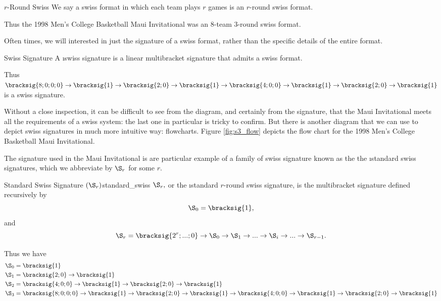 {    \begin{definition}{$r$-Round Swiss}{}
        We say a swiss format in which each team plays $r$ games is an $r$-round swiss format.
    \end{definition}

    Thus the 1998 Men's College Basketball Maui Invitational was an 8-team 3-round swiss format.

    Often times, we will interested in just the signature of a swiss format, rather than the specific details of the entire format.

    \begin{definition}{Swiss Signature}{}
        A \i{swiss signature} is a linear multibracket signature that admits a swiss format.
    \end{definition}

    Thus $\bracksig{8;0;0;0} \to \bracksig{1} \to \bracksig{2;0} \to \bracksig{1} \to \bracksig{4;0;0} \to \bracksig{1} \to \bracksig{2;0} \to \bracksig{1}$ is a swiss signature.

    Without a close inspection, it can be difficult to see from the diagram, and certainly from the signature, that the Maui Invitational meets all the requirements of a swiss system: the last one in particular is tricky to confirm. But there is another diagram that we can use to depict swiss signatures in much more intuitive way: flowcharts. Figure \ref{fig:s3_flow} depicts the flow chart for the 1998 Men's College Basketball Maui Invitational. %



    The signature used in the Maui Invitational is are particular example of a family of swiss signature known as the the \i{standard swiss signatures}, which we abbreviate by $\S_r$ for some $r$.

    \begin{definition}{Standard Swiss Signature $(\S_r)$}{standard_swiss}
        $\S_r,$ or the \i{standard $r$-round swiss signature}, is the multibracket signature defined recursively by $$\S_0 = \bracksig{1},$$ and
        $$\S_r = \bracksig{2^r; ...; 0} \to \S_{0} \to \S_1 \to ... \to \S_i \to ... \to \S_{r-1}.$$
    \end{definition}

    Thus we have
    \begin{align*}
        \S_0 =\; &\bracksig{1}\\
        \S_1 =\; &\bracksig{2;0} \to \bracksig{1}\\
        \S_2 =\; &\bracksig{4;0;0} \to \bracksig{1} \to \bracksig{2;0} \to \bracksig{1}\\
        \S_3 =\; &\bracksig{8;0;0;0} \to \bracksig{1} \to \bracksig{2;0} \to \bracksig{1} \to \bracksig{4;0;0} \to \bracksig{1} \to \bracksig{2;0} \to \bracksig{1}
    \end{align*}

}
